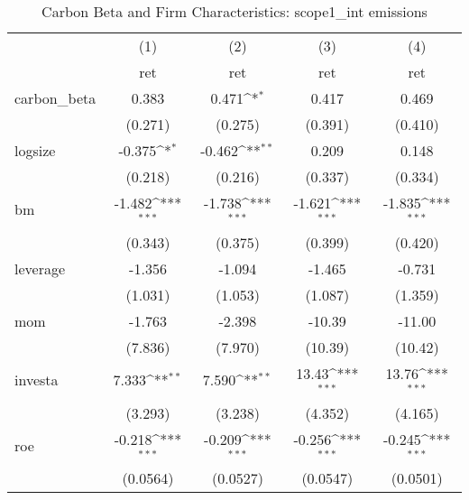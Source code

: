 \begin{table}[htbp]\centering
\def\sym#1{\ifmmode^{#1}\else\(^{#1}\)\fi}
\caption{Carbon Beta and Firm Characteristics: scope1\_int emissions}
\begin{tabular}{l*{4}{c}}
\hline\hline
                    &\multicolumn{1}{c}{(1)}&\multicolumn{1}{c}{(2)}&\multicolumn{1}{c}{(3)}&\multicolumn{1}{c}{(4)}\\
                    &\multicolumn{1}{c}{ret}&\multicolumn{1}{c}{ret}&\multicolumn{1}{c}{ret}&\multicolumn{1}{c}{ret}\\
\hline
carbon\_beta         &       0.383         &       0.471\sym{*}  &       0.417         &       0.469         \\
                    &     (0.271)         &     (0.275)         &     (0.391)         &     (0.410)         \\
[1em]
logsize             &      -0.375\sym{*}  &      -0.462\sym{**} &       0.209         &       0.148         \\
                    &     (0.218)         &     (0.216)         &     (0.337)         &     (0.334)         \\
[1em]
bm                  &      -1.482\sym{***}&      -1.738\sym{***}&      -1.621\sym{***}&      -1.835\sym{***}\\
                    &     (0.343)         &     (0.375)         &     (0.399)         &     (0.420)         \\
[1em]
leverage            &      -1.356         &      -1.094         &      -1.465         &      -0.731         \\
                    &     (1.031)         &     (1.053)         &     (1.087)         &     (1.359)         \\
[1em]
mom                 &      -1.763         &      -2.398         &      -10.39         &      -11.00         \\
                    &     (7.836)         &     (7.970)         &     (10.39)         &     (10.42)         \\
[1em]
investa             &       7.333\sym{**} &       7.590\sym{**} &       13.43\sym{***}&       13.76\sym{***}\\
                    &     (3.293)         &     (3.238)         &     (4.352)         &     (4.165)         \\
[1em]
roe                 &      -0.218\sym{***}&      -0.209\sym{***}&      -0.256\sym{***}&      -0.245\sym{***}\\
                    &    (0.0564)         &    (0.0527)         &    (0.0547)         &    (0.0501)         \\

\end{tabular}
\end{table}
